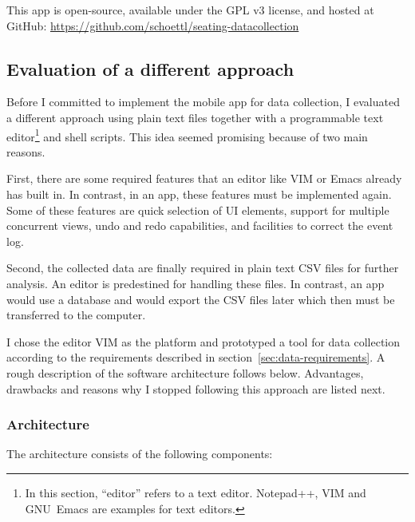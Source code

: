 This app is open-source, available under the GPL v3 license, and hosted at
GitHub: \url{https://github.com/schoettl/seating-datacollection}

\subsection{Evaluation of a different approach}

Before I committed to implement the mobile app for data collection, I evaluated
a different approach using plain text files together with a programmable text
editor\footnote{In this section, ``editor'' refers to a text editor. Notepad++,
VIM and GNU~Emacs are examples for text editors.} and shell scripts.
This idea seemed promising because of two main reasons.

First, there are some required features that an editor like VIM or Emacs already
has built in.
In contrast, in an app, these features must be implemented again.
Some of these features are quick selection of \acs{UI} elements, support for
multiple concurrent views, undo and redo capabilities, and facilities to correct
the event log.

Second, the collected data are finally required in plain text \acs{CSV} files for
further analysis.
An editor is predestined for handling these files.
In contrast, an app would use a database and would export the \acs{CSV} files later
which then must be transferred to the computer.

I chose the editor VIM as the platform and prototyped a tool for data
collection according to the requirements described in
section~\ref{sec:data-requirements}.
A rough description of the software architecture follows below.
Advantages, drawbacks and reasons why I stopped following this approach are
listed next.

\subsubsection{Architecture}

The architecture consists of the following components:

